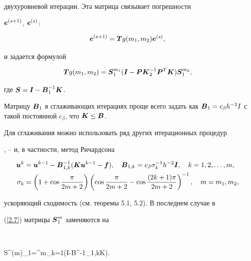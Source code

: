 двухуровневой итерации. Эта матрица связывает погрешности


$\boldsymbol e^{(s+1)}$, $\boldsymbol e^{(s)}$:


$$


\bi e^{(s+1)}=\bi Tg(m_1,m_2)\bi e^{(s)},


$$


и задается формулой


\begin{equation}\label{2.7}


\bi Tg(m_1,m_2)=\bi S_1^{m_1}(\bi I-\bi P\bi K^{-1}_2\bi P^T


\bi K)\bi S_1^{m_2},


\end{equation}


где $\boldsymbol S=\boldsymbol I-\boldsymbol B_1^{-1}\boldsymbol K$.





Матрицу $\bi B_1$ в сглаживающих итерациях проще всего задать как $\bi


B_1=c_\beta h^{-2} I$ с такой постоянной $c_\beta$, что $\bi K\le\bi B$.


Для сглаживания можно использовать ряд других итерационных процедур


\cite{[3]}, \cite{[17]}--\cite{[21]} и, в частности, метод Ричардсона


\begin{equation}\label{2.8}


\begin{split}


\bi u^k&=\bi u^{k-1}-\bi B^{-1}_{1,k}(\bi K\bi u^{k-1}-\bi f),


\quad


\bi B_{1,k}=c_\beta\sigma_k^{-1}h^{-2}\bi I,\quad k=1,2,\dotsc,m,\\


\sigma_k&=\left(1+\cos\frac{\pi}{2m+2}\right)\left(\cos\frac{\pi}


{2m+2}-\cos\frac{(2k+1)\pi}{2m+2}\right)^{-1},\quad m=m_1, m_2,


\end{split}


\end{equation}


ускоряющий сходимость (см. теоремы 5.1, 5.2). В последнем случае в


(\ref{2.7}) матрицы $\boldsymbol S^m_1$ заменяются на


$$


\bi S^{(m)}_1=\bigcap^m_{k=1}(\bi I-\bi B^{-1}_{1,k}\bi K).


